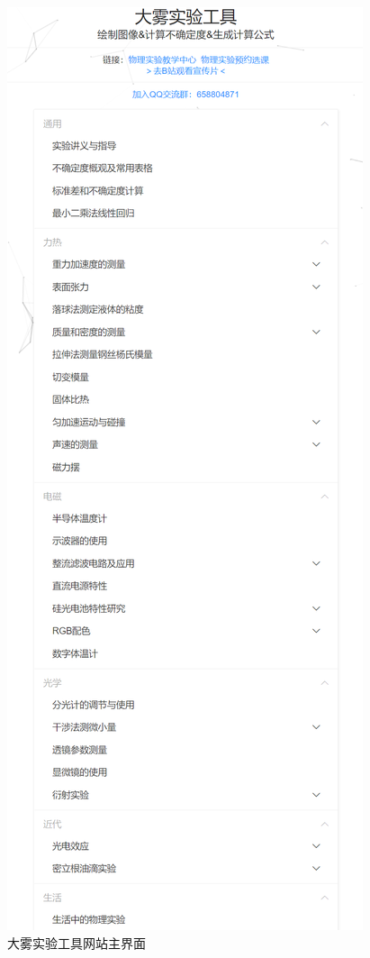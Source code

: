 \begin{figure}[p]
  \centering
  \includegraphics[height=0.95\textheight]{figure/main.png}
  \caption{大雾实验工具网站主界面}
  \label{fig:main}
\end{figure}

